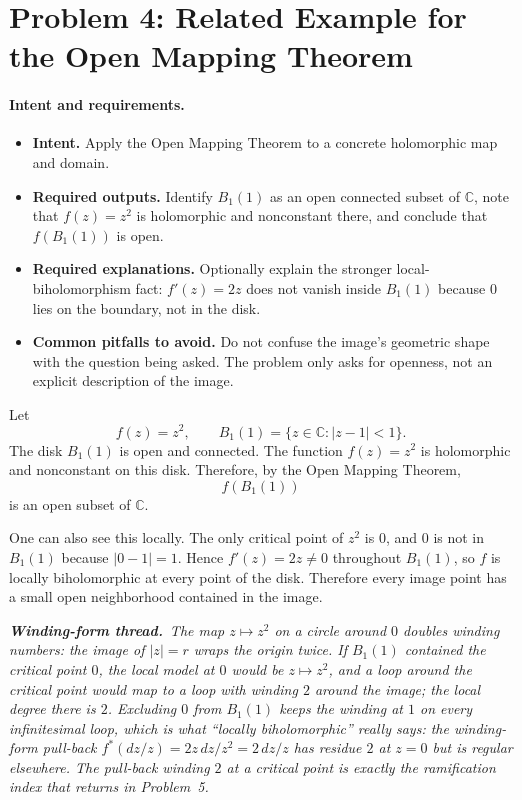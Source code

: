 \documentclass[11pt]{article}
\newcommand{\windingnote}[1]{%
\par\smallskip
\noindent\begin{minipage}{\linewidth}%
\color{windingblue}\small%
\textbf{\textit{Winding-form thread.}}\ \textit{#1}%
\end{minipage}\par\smallskip%
}
\newcommand{\C}{\mathbb{C}}
\newenvironment{intentrequirements}{%
\paragraph{Intent and requirements.}
\begin{itemize}[leftmargin=*, itemsep=0.25em]
}{%
\end{itemize}
}
\begin{document}
\section*{Problem 4: Related Example for the Open Mapping Theorem}

\begin{intentrequirements}
\item \textbf{Intent.} Apply the Open Mapping Theorem to a concrete holomorphic map and domain.
\item \textbf{Required outputs.} Identify $B_1(1)$ as an open connected subset of $\C$, note that $f(z)=z^2$ is holomorphic and nonconstant there, and conclude that $f(B_1(1))$ is open.
\item \textbf{Required explanations.} Optionally explain the stronger local-biholomorphism fact: $f'(z)=2z$ does not vanish inside $B_1(1)$ because $0$ lies on the boundary, not in the disk.
\item \textbf{Common pitfalls to avoid.} Do not confuse the image's geometric shape with the question being asked. The problem only asks for openness, not an explicit description of the image.
\end{intentrequirements}

Let
\[
 f(z)=z^2,\qquad B_1(1)=\{z\in\C:|z-1|<1\}.
\]
The disk $B_1(1)$ is open and connected. The function $f(z)=z^2$ is holomorphic and nonconstant on this disk. Therefore, by the Open Mapping Theorem,
\[
 f(B_1(1))
\]
is an open subset of $\C$.

One can also see this locally. The only critical point of $z^2$ is $0$, and $0$ is not in $B_1(1)$ because $|0-1|=1$. Hence $f'(z)=2z\neq0$ throughout $B_1(1)$, so $f$ is locally biholomorphic at every point of the disk. Therefore every image point has a small open neighborhood contained in the image.

\windingnote{The map $z\mapsto z^2$ on a circle around $0$ \emph{doubles} winding numbers: the image of $|z|=r$ wraps the origin twice. If $B_1(1)$ contained the critical point $0$, the local model at $0$ would be $z\mapsto z^2$, and a loop around the critical point would map to a loop with winding $2$ around the image; the local degree there is $2$. Excluding $0$ from $B_1(1)$ keeps the winding at $1$ on every infinitesimal loop, which is what ``locally biholomorphic'' really says: the winding-form pull-back $f^*(dz/z)=2z\,dz/z^2=2\,dz/z$ has residue $2$ at $z=0$ but is regular elsewhere. The pull-back winding $2$ at a critical point is exactly the ramification index that returns in Problem~5.}
\end{document}
